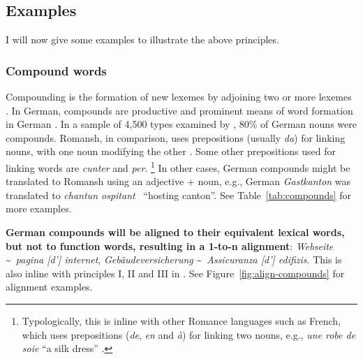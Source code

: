 

\subsection{Examples}
I will now give some examples to illustrate the above principles.
\subsubsection{Compound words}
Compounding is the formation of new lexemes by adjoining two or more lexemes \autocite{bauer1988}. In German, compounds are productive and prominent means of word formation in German \autocite{clematide2018}. 
In a sample of 4,500 types examined by \cite{clematide2018}, 80\% of German nouns were compounds.
Romansh, in comparison, uses prepositions (usually \emph{da}) for linking nouns, with one noun modifying the other \autocite{valladers}. Some other prepositions used for linking words are \emph{cunter} and \emph{per}.
\footnote{Typologically, this is inline with other Romance languages such as French, which uses prepositions (\emph{de}, \emph{en} and \emph{à}) for linking two nouns, e.g., \emph{une robe de soie} \enquote{a silk dress} \autocite[510]{price2008}.}
In other cases, German compounds might be translated to Romansh using an adjective + noun, e.g., German \emph{Gastkanton} was translated to \emph{chantun ospitant} ~\enquote{hosting canton}.
See Table~\ref{tab:compounds} for more examples.

\textbf{German compounds will be aligned to their equivalent lexical words, but not to function words, resulting in a 1-to-n alignment}: \emph{Webseite} \textasciitilde~\emph{pagina [d'] internet}, \emph{Gebäudeversicherung} \textasciitilde~\emph{Assicuranza [d'] edifizis}. 
This is also inline with principles I, II and III in \cite{clematide2018}. 
See Figure~\ref{fig:align-compounds} for alignment examples.

